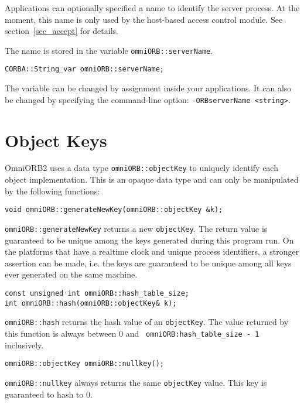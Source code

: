 \documentclass[11pt,twoside,onecolumn]{book}
\begin{document}
Applications can optionally specified a name to identify the server
process. At the moment, this name is only used by the host-based access
control module. See section~\ref{sec_accept} for details.

The name is stored in the variable {\tt omniORB::serverName}.

{\small
\begin{verbatim}
CORBA::String_var omniORB::serverName;
\end{verbatim}
}

The variable can be changed by assignment inside your applications. It can
also be changed by specifying the command-line option: {\tt -ORBserverName
<string>}.
 
\section{Object Keys}

OmniORB2 uses a data type {\tt omniORB::objectKey} to uniquely
identify each object implementation. This is an opaque data type and 
can only be manipulated by the following functions:

{\small
\begin{verbatim}
void omniORB::generateNewKey(omniORB::objectKey &k);
\end{verbatim}
}

{\tt omniORB::generateNewKey} returns a new {\tt objectKey}. The return
value is guaranteed to be unique among the keys generated during this program
run. On the platforms that have a realtime clock and unique process
identifiers, a stronger assertion can be made, i.e. the keys are guaranteed
to be unique among all keys ever generated on the same machine.

{\small
\begin{verbatim}
const unsigned int omniORB::hash_table_size;
int omniORB::hash(omniORB::objectKey& k);
\end{verbatim}
}

{\tt omniORB::hash} returns the hash value of an {\tt objectKey}. The value
returned by this function is always between 0 and {\tt
omniORB:hash\_table\_size - 1} inclusively.

{\small
\begin{verbatim}
omniORB::objectKey omniORB::nullkey();
\end{verbatim}
}

{\tt omniORB::nullkey} always returns the same {\tt objectKey} value. This
key is guaranteed to hash to 0.
\end{document}
